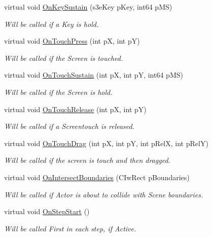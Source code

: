 \begin{DoxyCompactItemize}
virtual void \hyperlink{class_i_ty_actor_aa6008d50671f63f7ca482b54179b7725}{OnKeySustain} (s3eKey pKey, int64 pMS)
\begin{DoxyCompactList}\small\item\em Will be called if a Key is hold. \end{DoxyCompactList}\item 
virtual void \hyperlink{class_i_ty_actor_ae828745012aac359147920ccb42801b9}{OnTouchPress} (int pX, int pY)
\begin{DoxyCompactList}\small\item\em Will be called if the Screen is touched. \end{DoxyCompactList}\item 
virtual void \hyperlink{class_i_ty_actor_adb1cde3971b3d75407a8fbb590f7088a}{OnTouchSustain} (int pX, int pY, int64 pMS)
\begin{DoxyCompactList}\small\item\em Will be called if the Screen is hold. \end{DoxyCompactList}\item 
virtual void \hyperlink{class_i_ty_actor_a240c68f34a3b90af8bbef1729a74114a}{OnTouchRelease} (int pX, int pY)
\begin{DoxyCompactList}\small\item\em Will be called if a Screentouch is released. \end{DoxyCompactList}\item 
virtual void \hyperlink{class_i_ty_actor_ad07610fc8cd2e0ade09d777979102a22}{OnTouchDrag} (int pX, int pY, int pRelX, int pRelY)
\begin{DoxyCompactList}\small\item\em Will be called if the screen is touch and then dragged. \end{DoxyCompactList}\item 
virtual void \hyperlink{class_i_ty_actor_a9da03663a14f091ce23a5adae98e2302}{OnIntersectBoundaries} (CIwRect pBoundaries)
\begin{DoxyCompactList}\small\item\em Will be called if Actor is about to collide with Scene boundaries. \end{DoxyCompactList}\item 
virtual void \hyperlink{class_i_ty_actor_aeed7b53859c91f8be589ff441f36852d}{OnStepStart} ()
\begin{DoxyCompactList}\small\item\em Will be called First in each step, if Active. \end{DoxyCompactList}\item 

\end{DoxyCompactItemize}
